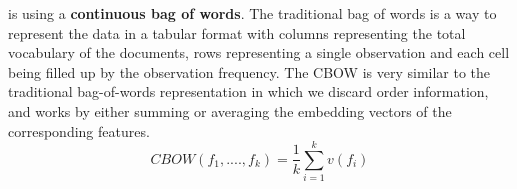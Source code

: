 \documentclass{scrartcl}
\begin{document}
    is using a \textbf{continuous bag of words}. The traditional bag of words 
    is a way to represent the data in a tabular format with columns representing the 
    total vocabulary of the documents, rows representing a single observation and each cell
    being filled up by the observation frequency.
    The CBOW is very similar to the traditional bag-of-words representation in which
    we discard order information, and works by either summing or averaging the 
    embedding vectors of the corresponding features.
    \begin{equation}
        CBOW(f_1, ...., f_k) = \frac{1}{k} \sum^{k}_{i=1}v(f_i)
    \end{equation}
    
\end{document}
